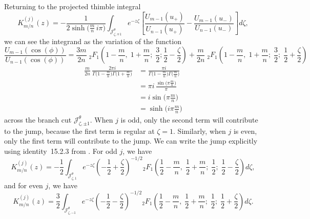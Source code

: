 \documentclass{article}
\theoremstyle{definition}
\theoremstyle{plain}
\newenvironment{verify}{\color{ForestGreen}}{\color{black}}
\newenvironment{old}{\color{RoyalBlue}}{\color{black}}
\begin{document}
\begin{old}
Returning to the projected thimble integral
\[ K^{(j)}_{m/n}(z) = -\frac{1}{2\sinh\big(\tfrac{m}{n}\,i\pi\big)} \int_{\mathcal{J}^\theta_{\zeta, \mp 1}} e^{-z\zeta} \left[ \frac{U_{m-1}(u_+)}{U_{n-1}(u_+)} - \frac{U_{m-1}(u_-)}{U_{n-1}(u_-)} \right] d\zeta, \]
we can see the integrand as the variation of the function
\[ \frac{U_{m-1}(\cos(\phi))}{U_{n-1}(\cos(\phi))} = \frac{3m}{2n}\;{}_2F_1\left(1 - \frac{m}{n},\;1 + \frac{m}{n};\;\frac{3}{2};\frac{1}{2} - \frac{\zeta}{2}\right) + \frac{m}{2n}\;{}_2F_1\left(1 - \frac{m}{n},\;1 + \frac{m}{n};\;\frac{3}{2};\;\frac{1}{2} + \frac{\zeta}{2}\right) \]
\begin{verify}
\begin{align*}
\frac{m}{2n}\,\frac{2\pi i}{\Gamma\big(1-\tfrac{m}{n}\big)\Gamma\big(1+\tfrac{m}{n}\big)} & = \frac{\pi i}{\Gamma\big(1-\tfrac{m}{n}\big)\Gamma\big(\tfrac{m}{n}\big)} \\
& = \pi i\,\frac{\sin\big(\pi\tfrac{m}{n}\big)}{\pi} \\
& = i \sin\big(\pi\tfrac{m}{n}\big) \\
&= \sinh\big(i\pi\tfrac{m}{n}\big)
\end{align*}
\end{verify}
across the branch cut $\mathcal{J}^\theta_{\zeta, \pm 1}$. When $j$ is odd, only the second term will contribute to the jump, because the first term is regular at $\zeta = 1$. Similarly, when $j$ is even, only the first term will contribute to the jump. We can write the jump explicitly using identity~15.2.3 from \cite{dlmf}. For odd $j$, we have
\[ K^{(j)}_{m/n}(z) = -\frac{1}{2} \int_{\mathcal{J}^\theta_{\zeta, 1}} e^{-z\zeta} \left(-\frac{1}{2}+\frac{\zeta}{2}\right)^{-1/2} {}_2F_1\left(\frac{1}{2} - \frac{m}{n},\;\frac{1}{2} + \frac{m}{n};\;\frac{1}{2};\;\frac{1}{2} - \frac{\zeta}{2}\right) d\zeta, \]
and for even $j$, we have
\[ K^{(j)}_{m/n}(z) = \frac{3}{2} \int_{\mathcal{J}^\theta_{\zeta, -1}} e^{-z\zeta} \left(-\frac{1}{2}-\frac{\zeta}{2}\right)^{-1/2} {}_2F_1\left(\frac{1}{2} - \frac{m}{n},\;\frac{1}{2} + \frac{m}{n};\;\frac{1}{2};\;\frac{1}{2} + \frac{\zeta}{2}\right) d\zeta. \]


\end{old}
\end{document}

